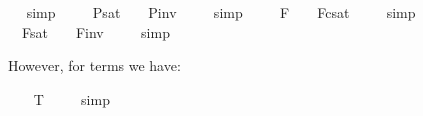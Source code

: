 \begin{isabellebody}
\isadelimproof
\ %
\endisadelimproof
%
\isatagproof
{}\isamarkupfalse%
\ simp\ \isamarkupfalse%
%
\endisatagproof
{\isafoldproof}%
%
\isadelimproof
%
\endisadelimproof
\isanewline
\ \isamarkupfalse%
\ \ {\isachardoublequoteopen}{\isacharbrackleft}{\isasymphi}\isactrlsup P{\isacharbrackright}\isactrlsup s\isactrlsup a\isactrlsup t\ {\isacharequal}\ {\isasymtop}\ {\isasymlongleftrightarrow}\ {\isacharbrackleft}{\isasymphi}\isactrlsup P{\isacharbrackright}\isactrlsup i\isactrlsup n\isactrlsup v\ {\isacharequal}\ {\isasymbottom}{\isachardoublequoteclose}%
\isadelimproof
\ %
\endisadelimproof
%
\isatagproof
{}\isamarkupfalse%
\ simp\ \isamarkupfalse%
%
\endisatagproof
{\isafoldproof}%
%
\isadelimproof
%
\endisadelimproof
\isanewline
\ \isamarkupfalse%
\ \ {\isachardoublequoteopen}{\isacharbrackleft}{\isasymphi}\isactrlsup F{\isacharbrackright}\ {\isacharequal}\ {\isasymtop}\ {\isasymlongleftrightarrow}\ {\isacharbrackleft}{\isasymphi}\isactrlsup F{\isacharbrackright}\isactrlsup c\isactrlsup s\isactrlsup a\isactrlsup t\ {\isacharequal}\ {\isasymbottom}{\isachardoublequoteclose}%
\isadelimproof
\ %
\endisadelimproof
%
\isatagproof
{}\isamarkupfalse%
\ simp\ \isamarkupfalse%
%
\endisatagproof
{\isafoldproof}%
%
\isadelimproof
%
\endisadelimproof
\isanewline
\ \isamarkupfalse%
\ \ {\isachardoublequoteopen}{\isacharbrackleft}{\isasymphi}\isactrlsup F{\isacharbrackright}\isactrlsup s\isactrlsup a\isactrlsup t\ {\isacharequal}\ {\isasymtop}\ {\isasymlongleftrightarrow}\ {\isacharbrackleft}{\isasymphi}\isactrlsup F{\isacharbrackright}\isactrlsup i\isactrlsup n\isactrlsup v\ {\isacharequal}\ {\isasymbottom}{\isachardoublequoteclose}%
\isadelimproof
\ %
\endisadelimproof
%
\isatagproof
{}\isamarkupfalse%
\ simp\ \isamarkupfalse%
%
\endisatagproof
{\isafoldproof}%
%
\isadelimproof
%
\endisadelimproof
%
\begin{isamarkuptext}%
However, for terms we have:%
\end{isamarkuptext}%
\isamarkuptrue%
\ \isamarkupfalse%
\ \ {\isachardoublequoteopen}{\isacharbrackleft}{\isasymphi}\isactrlsup T{\isacharbrackright}\ {\isacharequal}\ {\isacharasterisk}{\isachardoublequoteclose}%
\isadelimproof
\ %
\endisadelimproof
%
\isatagproof
{}\isamarkupfalse%
\ simp\ \isamarkupfalse%
%
\endisatagproof
{\isafoldproof}%
%
\isadelimproof
%
\endisadelimproof
\isanewline
\ \isamarkupfalse%

\end{isabellebody}
